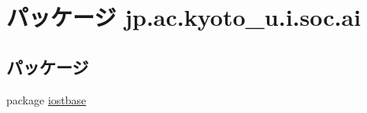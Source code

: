 \hypertarget{namespacejp_1_1ac_1_1kyoto__u_1_1i_1_1soc_1_1ai}{\section{パッケージ jp.\-ac.\-kyoto\-\_\-u.\-i.\-soc.\-ai}
\label{namespacejp_1_1ac_1_1kyoto__u_1_1i_1_1soc_1_1ai}
}
\subsection*{パッケージ}
\begin{DoxyCompactItemize}
\item 
package \hyperlink{namespacejp_1_1ac_1_1kyoto__u_1_1i_1_1soc_1_1ai_1_1iostbase}{iostbase}
\end{DoxyCompactItemize}
